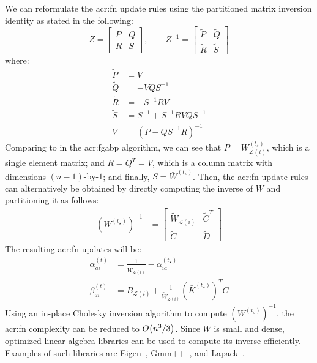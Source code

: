 We can reformulate the \gls{acr:fn} update rules using the partitioned matrix inversion identity as stated in the following:
\begin{equation}
	Z=\left[\begin{array}{cc}
		P & Q\\
		R & S
	\end{array}\right],\qquad Z^{-1}=\left[\begin{array}{cc}
		\tilde{P} & \tilde{Q}\\
		\tilde{R} & \tilde{S}
	\end{array}\right]
	\label{eqn:invPar}
\end{equation}
where:
\begin{align*}
	\tilde{P} & =V\\
	\tilde{Q} & =-VQS^{-1}\\
	\tilde{R} & =-S^{-1}RV\\
	\tilde{S} & =S^{-1}+S^{-1}RVQS^{-1}\\
	V & =\left(P-QS^{-1}R\right)^{-1}
\end{align*}
Comparing  to  in the \gls{acr:fgabp} algorithm, we can see that $P = W^{(t_\star)}_{\mathcal{L}(i)}$, which is a single element matrix; and $R=Q^T=V$, which is a column matrix with dimensions $(n-1)\text{-by-}1$; and finally, $S = \bar{W}^{(t_\star)}$.
Then, the \gls{acr:fn} update rules can alternatively be obtained by directly computing the inverse of $W$ and partitioning it as follows:
\begin{align}
	(W^{(t_\star)})^{-1} & =\left[\begin{array}{cc}
		\tilde{W}_{\mathcal{L}(i)} & \tilde{C}^{T}\\
		\tilde{C} & \tilde{D}
	\end{array}\right] \label{eqn:fnInv}
\end{align}
The resulting \gls{acr:fn} updates will be:
\begin{align}
	\alpha_{ai}^{(t)} & =\frac{1}{\tilde{W}_{\mathcal{L}(i)}}-\alpha_{ia}^{(t_\star)} \label{eqn:fna2}\\
	\beta_{ai}^{(t)} & =B_{\mathcal{L}(i)}+\frac{1}{\tilde{W}_{\mathcal{L}(i)}}(\bar{K}^{(t_\star)})^{T}\tilde{C} \label{eqn:fnb2}
\end{align}
Using an in-place Cholesky inversion algorithm to compute $(W^{(t_\star)})^{-1}$, the \gls{acr:fn} complexity can be reduced to $ O\bigl(n^3/3\bigr)$.
Since $W$ is small and dense, optimized linear algebra libraries can be used to compute its inverse efficiently.
Examples of such libraries are Eigen~\cite{bib:eigen}, Gmm++~\cite{bib:gmm}, and Lapack~\cite{bib:lapack}.


